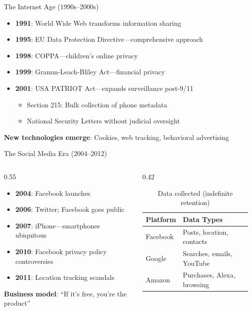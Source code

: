 ﻿\documentclass[aspectratio=169,11pt]{beamer}
\begin{document}
\begin{frame}{The Internet Age (1990s--2000s)}
\begin{itemize}
    \item \textbf{1991}: World Wide Web transforms information sharing
    \item \textbf{1995}: EU Data Protection Directive---comprehensive approach
    \item \textbf{1998}: COPPA---children's online privacy
    \item \textbf{1999}: Gramm-Leach-Bliley Act---financial privacy
    \item \textbf{2001}: USA PATRIOT Act---expands surveillance post-9/11
    \begin{itemize}
        \item Section 215: Bulk collection of phone metadata
        \item National Security Letters without judicial oversight
    \end{itemize}
\end{itemize}

\vspace{0.3em}
\textbf{New technologies emerge}: Cookies, web tracking, behavioral advertising
\end{frame}

\begin{frame}{The Social Media Era (2004--2012)}
\begin{columns}[T]
\begin{column}{0.55\textwidth}
\begin{itemize}
    \item \textbf{2004}: Facebook launches
    \item \textbf{2006}: Twitter; Facebook goes public
    \item \textbf{2007}: iPhone---smartphones ubiquitous
    \item \textbf{2010}: Facebook privacy policy controversies
    \item \textbf{2011}: Location tracking scandals
\end{itemize}

\vspace{0.3em}
\textbf{Business model}: ``If it's free, you're the product''
\end{column}
\begin{column}{0.42\textwidth}
\begin{table}[h]
\centering
\scriptsize
\begin{tabular}{@{}ll@{}}
\toprule
\textbf{Platform} & \textbf{Data Types} \\
\midrule
Facebook & Posts, location, contacts \\
Google & Searches, emails, YouTube \\
Amazon & Purchases, Alexa, browsing \\
\bottomrule
\end{tabular}
\caption*{\scriptsize Data collected (indefinite retention)}
\end{table}
\end{column}
\end{columns}
\end{frame}
\end{document}
